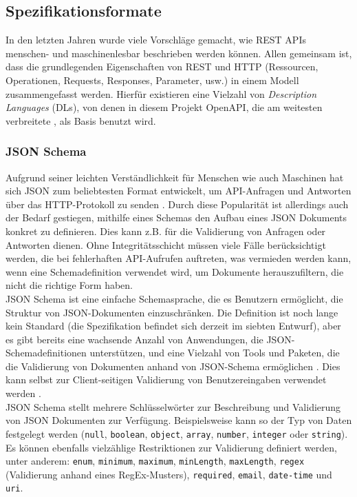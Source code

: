 \subsection{Spezifikationsformate}

In den letzten Jahren wurde viele Vorschläge gemacht, wie REST APIs menschen- und maschinenlesbar beschrieben werden können. Allen gemeinsam ist, dass die grundlegenden Eigenschaften von REST und HTTP (Ressourcen, Operationen, Requests, Responses, Parameter, usw.) in einem Modell zusammengefasst werden. Hierfür existieren eine Vielzahl von \emph{Description Languages} (DLs), von denen in diesem Projekt OpenAPI, die am weitesten verbreitete \parencite{scherer2016description}, als Basis benutzt wird.

\subsubsection{JSON Schema}

Aufgrund seiner leichten Verständlichkeit für Menschen wie auch Maschinen hat sich JSON zum beliebtesten Format entwickelt, um API-Anfragen und Antworten über das HTTP-Protokoll zu senden \parencite[263]{pezoa2016foundations}. Durch diese Popularität ist allerdings auch der Bedarf gestiegen, mithilfe eines Schemas den Aufbau eines JSON Dokuments konkret zu definieren. Dies kann z.B. für die Validierung von Anfragen oder Antworten dienen. Ohne Integritätsschicht müssen viele Fälle berücksichtigt werden, die bei fehlerhaften API-Aufrufen auftreten, was vermieden werden kann, wenn eine Schemadefinition verwendet wird, um Dokumente herauszufiltern, die nicht die richtige Form haben. \\

JSON Schema ist eine einfache Schemasprache, die es Benutzern ermöglicht, die Struktur von JSON-Dokumenten einzuschränken. Die Definition ist noch lange kein Standard (die Spezifikation befindet sich derzeit im siebten Entwurf), aber es gibt bereits eine wachsende Anzahl von Anwendungen, die JSON-Schemadefinitionen unterstützen, und eine Vielzahl von Tools und Paketen, die die Validierung von Dokumenten anhand von JSON-Schema ermöglichen \parencite[264]{pezoa2016foundations}. Dies kann selbst zur Client-seitigen Validierung von Benutzereingaben verwendet werden \parencite{sturgeon2018validation}. \\

JSON Schema stellt mehrere Schlüsselwörter zur Beschreibung und Validierung von JSON Dokumenten zur Verfügung. Beispielsweise kann so der Typ von Daten festgelegt werden (\lstinline|null|, \lstinline|boolean|, \lstinline|object|, \lstinline|array|, \lstinline|number|, \lstinline|integer| oder \lstinline|string|). Es können ebenfalls vielzählige Restriktionen zur Validierung definiert werden, unter anderem: \lstinline|enum|, \lstinline|minimum|, \lstinline|maximum|, \lstinline|minLength|, \lstinline|maxLength|, \lstinline|regex| (Validierung anhand eines RegEx-Musters), \lstinline|required|, \lstinline|email|, \lstinline|date-time| und \lstinline|uri|. \\

